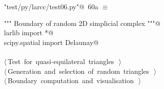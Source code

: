 \documentclass[11pt,oneside]{article}    %
\begin{document}
\begin{flushleft} \small
\begin{minipage}{\linewidth} \label{scrap113}
\protect{}\verb@"test/py/larcc/test06.py"@\nobreak\ {\footnotesize 60a }$\equiv$
\vspace{-1ex}
\begin{list}{}{} \item
\mbox{}\verb@""" Boundary of random 2D simplicial complex """@\\
\mbox{}\verb@from larlib import *@\\
\mbox{}\verb@from scipy.spatial import Delaunay@\\
\mbox{}\verb@@\\
\mbox{}\verb@@\hbox{$\langle\,$Test for quasi-equilateral triangles\nobreak\ {\footnotesize {}}$\,\rangle$}\verb@@\\
\mbox{}\verb@@\hbox{$\langle\,$Generation and selection of random triangles\nobreak\ {\footnotesize {}}$\,\rangle$}\verb@@\\
\mbox{}\verb@@\hbox{$\langle\,$Boundary computation and visualisation\nobreak\ {\footnotesize {}}$\,\rangle$}\verb@@\\
\mbox{}\verb@@{\NWsep}
\end{list}
\vspace{-2ex}
\end{minipage}\\[4ex]
\end{flushleft}
\end{document}
